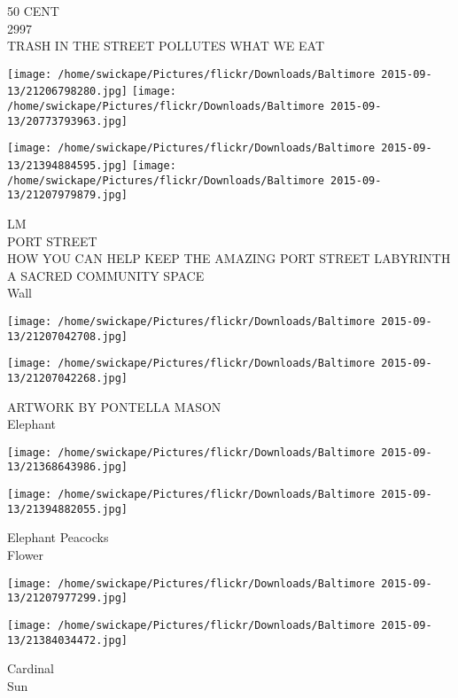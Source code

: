 \documentclass[10pt,letterpaper]{article}
\begin{document}
50 CENT\\
2997\\
TRASH IN THE STREET POLLUTES WHAT WE EAT\\
\pagebreak

\texttt{[image: /home/swickape/Pictures/flickr/Downloads/Baltimore 2015-09-13/21206798280.jpg]}
\texttt{[image: /home/swickape/Pictures/flickr/Downloads/Baltimore 2015-09-13/20773793963.jpg]}

\texttt{[image: /home/swickape/Pictures/flickr/Downloads/Baltimore 2015-09-13/21394884595.jpg]}
\texttt{[image: /home/swickape/Pictures/flickr/Downloads/Baltimore 2015-09-13/21207979879.jpg]}

LM\\
PORT STREET\\
HOW YOU CAN HELP KEEP THE AMAZING PORT STREET LABYRINTH A SACRED COMMUNITY SPACE\\
Wall\\
\pagebreak

\texttt{[image: /home/swickape/Pictures/flickr/Downloads/Baltimore 2015-09-13/21207042708.jpg]}

\vspace{0.25in}
\texttt{[image: /home/swickape/Pictures/flickr/Downloads/Baltimore 2015-09-13/21207042268.jpg]}

ARTWORK BY PONTELLA MASON\\
Elephant\\
\pagebreak

\texttt{[image: /home/swickape/Pictures/flickr/Downloads/Baltimore 2015-09-13/21368643986.jpg]}

\vspace{0.25in}
\texttt{[image: /home/swickape/Pictures/flickr/Downloads/Baltimore 2015-09-13/21394882055.jpg]}

Elephant Peacocks\\
Flower\\
\pagebreak

\texttt{[image: /home/swickape/Pictures/flickr/Downloads/Baltimore 2015-09-13/21207977299.jpg]}

\vspace{0.25in}
\texttt{[image: /home/swickape/Pictures/flickr/Downloads/Baltimore 2015-09-13/21384034472.jpg]}

Cardinal\\
Sun\\
\pagebreak
\end{document}
